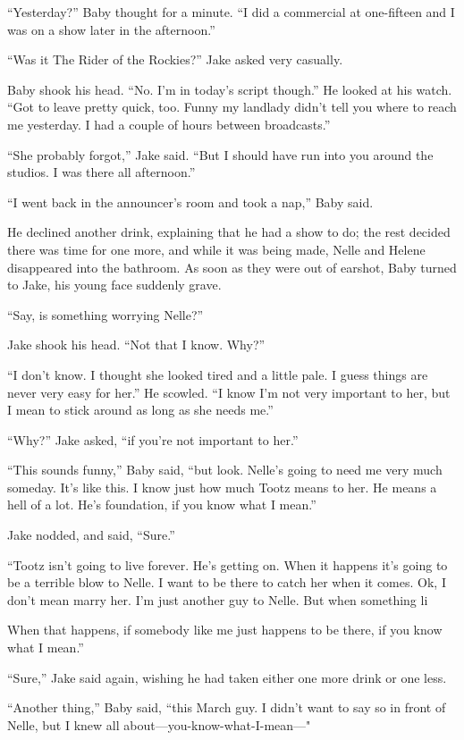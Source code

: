 \documentclass{novel}
\begin{document}
“Yesterday?” Baby thought for a minute. “I did a commercial at one-fifteen and I was on a show later in the afternoon.”

“Was it The Rider of the Rockies?” Jake asked very casually.

Baby shook his head. “No. I’m in today’s script though.” He looked at his watch. “Got to leave pretty quick, too. Funny my landlady didn’t tell you where to reach me yesterday. I had a couple of hours between broadcasts.”

“She probably forgot,” Jake said. “But I should have run into you around the studios. I was there all afternoon.”

“I went back in the announcer’s room and took a nap,” Baby said.

He declined another drink, explaining that he had a show to do; the rest decided there was time for one more, and while it was being made, Nelle and Helene disappeared into the bathroom. As soon as they were out of earshot, Baby turned to Jake, his young face suddenly grave.

“Say, is something worrying Nelle?”

Jake shook his head. “Not that I know. Why?”

“I don’t know. I thought she looked tired and a little pale. I guess things are never very easy for her.” He scowled. “I know I’m not very important to her, but I mean to stick around as long as she needs me.”

“Why?” Jake asked, “if you’re not important to her.”

“This sounds funny,” Baby said, “but look. Nelle’s going to need me very much someday. It’s like this. I know just how much Tootz means to her. He means a hell of a lot. He’s foundation, if you know what I mean.”

Jake nodded, and said, “Sure.”

“Tootz isn’t going to live forever. He’s getting on. When it happens it’s going to be a terrible blow to Nelle. I want to be there to catch her when it comes. Ok, I don’t mean marry her. I’m just another guy to Nelle. But when something li

When that happens, if somebody like me just happens to be there, if you know what I mean.”

“Sure,” Jake said again, wishing he had taken either one more drink or one less.

“Another thing,” Baby said, “this March guy. I didn’t want to say so in front of Nelle, but I knew all about—you-know-what-I-mean—"
\end{document}
